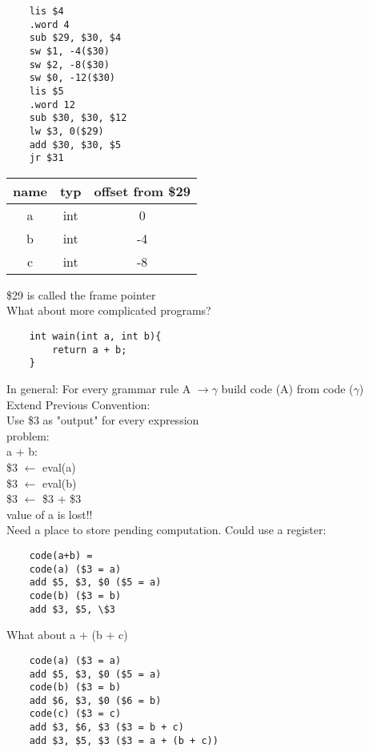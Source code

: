 \documentclass[12pt]{article}
\begin{document}
	\begin{verbatim}
	lis $4
	.word 4
	sub $29, $30, $4
	sw $1, -4($30)
	sw $2, -8($30)
	sw $0, -12($30)
	lis $5
	.word 12
	sub $30, $30, $12
	lw $3, 0($29)
	add $30, $30, $5
	jr $31
	\end{verbatim}
	
	\begin{tabular}{c | c | c }
		name & typ & offset from \$29 \\ \hline
		a & int & 0 \\
		b & int & -4 \\
		c & int & -8 \\
	\end{tabular}
	
	\$29 is called the frame pointer\\
	What about more complicated programs?\\
	
	\begin{verbatim}
	int wain(int a, int b){
		return a + b;
	}
	\end{verbatim}
	In general: For every grammar rule A $\rightarrow \gamma$ build code (A) from code ($\gamma$)\\
	
	Extend Previous Convention:\\
	Use \$3 as "output" for every expression\\
	
	problem:\\
	a + b:\\
	\$3 $\leftarrow$ eval(a)\\
	\$3 $\leftarrow$ eval(b)\\
	\$3 $\leftarrow$ \$3 + \$3\\
	value of a is lost!!\\
	
	Need a place to store pending computation. Could use a register:\\
	\begin{verbatim}
	code(a+b) = 
	code(a) ($3 = a)
	add $5, $3, $0 ($5 = a)
	code(b) ($3 = b)
	add $3, $5, \$3
	\end{verbatim}
	
	What about a + (b + c)\\
	\begin{verbatim}
	code(a) ($3 = a)
	add $5, $3, $0 ($5 = a)
	code(b) ($3 = b)
	add $6, $3, $0 ($6 = b)
	code(c) ($3 = c)
	add $3, $6, $3 ($3 = b + c)
	add $3, $5, $3 ($3 = a + (b + c))
	\end{verbatim}
	
\end{document}
